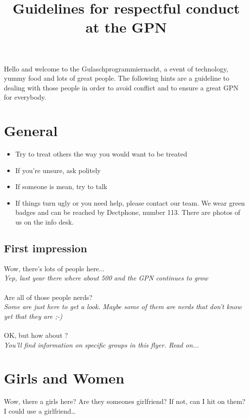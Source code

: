 \documentclass[10pt]{leaflet}
\date{\vspace{-5ex}}
\title{Guidelines for respectful conduct  at the GPN}
\begin{document}
\maketitle

Hello and welcome to the Gulaschprogrammiernacht, a event of
technology, yummy food and lots of great people. The following hints
are a guideline to dealing with those people in order to avoid
conflict and to ensure a great GPN for everybody.



\section{General}
\label{sec-1}
\begin{itemize}
\item Try to treat others the way you would want to be treated
\item If you're unsure, ask politely
\item If someone is mean, try to talk
\item If things turn ugly or you need help, please contact our team.
  We wear green badges and can be reached by Dectphone, number 113. There
  are photos of us on the info desk.
\end{itemize}


\subsection{First impression}
\label{sec-1-1}
Wow, there's lots of people here...\\
\emph{Yep, last year there where about 500 and the GPN continues to grow}\\\\

Are all of those people nerds?\\
\emph{Some are just here to get a look. Maybe some of them are nerds that don't know yet that they are ;-)}\\\\

OK, but how about \ledots{}?\\
\emph{You'll find information on specific groups in this flyer. Read on...}

\section{Girls and Women}
\label{sec-2}
Wow, there a girls here? Are they someones girlfriend? If not, can I
hit on them? I could use a girlfriend\ldots{}
\end{document}
